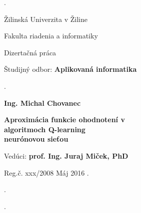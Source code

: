 \begin{titlepage}
\phantom.

\bigskip

\begin{center}
{\sc\LARGE Žilinská Univerzita v Žiline}
\medskip

{\sc\Large Fakulta riadenia a informatiky}

\vfill\vfill\vfill\vfill

{\sc\LARGE Dizertačná práca}

\medskip

{\large Študijný odbor: {\bf Aplikovaná informatika}}
\end{center}


\vfill\vfill\vfill\vfill


\phantom.\hfill
\begin{minipage}{10cm}
\begin{center}
{\large\bf Ing. Michal Chovanec}

\medskip

{\large\bf
  Aproximácia funkcie ohodnotení v \\
  algoritmoch Q-learning \\
  neurónovou sieťou
}

\medskip

Vedúci: {\bf prof. Ing. Juraj Miček, PhD}

\medskip

\hfill
Reg.č. xxx/2008
\hfill
Máj 2016
\hfill\phantom.
\end{center}
\end{minipage}
\hspace{1.7cm}\phantom.

\vspace{2.9cm}

\phantom.
\end{titlepage}



\begin{abstract}

\noindent
{\sc Michal Chovanec:} {\em   Aproximácia funkcie ohodnotení v algoritmoch Q-learning neurónovou sieťou}
[Dizertačná práca]

\noindent
Žilinská Univerzita v~Žiline,
Fakulta riadenia a informatiky,
Katedra technickej kybernetiky.

\noindent
Vedúci: prof. Ing. Juraj Miček, PhD

\noindent
FRI ŽU v~Žiline, 2016

\bigskip

Práca sa zoaberá aproximáciou funkcie ohodnotení konania agenta. V preistoroch
s malým počtom stavov predstavuje vhodné riešenie tabuľka. Pre prípady veľekého
počtu stavov je tabuľkové riešenie ťažko vypočítateĺné. Je tak nutné použiť
aproximáciu. Vhodným kandidátom je neurónová sieť. Tradičné riešenie doprednej
siete je však nepoužiteľné z dôvodov nemožnosti takúto sieť učiť. V práci
je preto venovaný priestor neurónovej sieti bázických funkcií ktorú už je možné
na daný problém trénovať iteračnými metódami.


\end{abstract}


